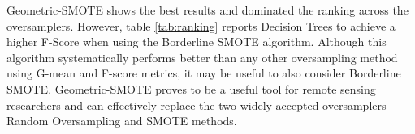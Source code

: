 \documentclass[parskip=full]{scrartcl}
\begin{document}
Geometric-SMOTE shows the best results and dominated the ranking across the
oversamplers. However, table \ref{tab:ranking} reports Decision Trees to achieve
a higher F-Score when using the Borderline SMOTE algorithm. Although this
algorithm systematically performs better than any other oversampling method
using G-mean and F-score metrics, it may be useful to also consider Borderline
SMOTE. Geometric-SMOTE proves to be a useful tool for remote sensing researchers
and can effectively replace the two widely accepted oversamplers Random
Oversampling and SMOTE methods.




\end{document}

